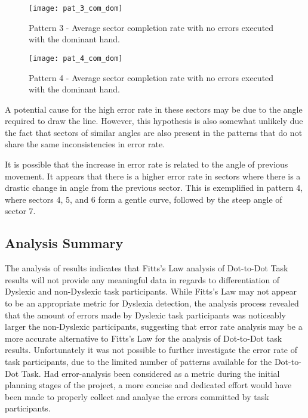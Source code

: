 		\begin{figure}[!h]
			\centering
			\texttt{[image: pat\_3\_com\_dom]}
			\caption{Pattern 3 - Average sector completion rate with no errors executed with the dominant hand.}
			\label{fig_pat_3_com_dom}
		\end{figure}		
		
		\begin{figure}[!h]
			\centering
			\texttt{[image: pat\_4\_com\_dom]}
			\caption{Pattern 4 - Average sector completion rate with no errors executed with the dominant hand.}
			\label{fig_pat_4_com_dom}
		\end{figure}	
		
		A potential cause for the high error rate in these sectors may be due to the angle required to draw the line. However, this hypothesis is also somewhat unlikely due the fact that sectors of similar angles are also present in the patterns that do not share the same inconsistencies in error rate. 
		
		It is possible that the increase in error rate is related to the angle of previous movement. It appears that there is a higher error rate in sectors where there is a drastic change in angle from the previous sector. This is exemplified in pattern 4, where sectors 4, 5, and 6 form a gentle curve, followed by the steep angle of sector 7.
		
	\subsection{Analysis Summary}
		The analysis of results indicates that Fitts’s Law analysis of Dot-to-Dot Task results will not provide any meaningful data in regards to differentiation of Dyslexic and non-Dyslexic task participants. While Fitts’s Law may not appear to be an appropriate metric for Dyslexia detection, the analysis process revealed that the amount of errors made by Dyslexic task participants was noticeably larger the non-Dyslexic participants, suggesting that error rate analysis may be a more accurate alternative to Fitts’s Law for the analysis of Dot-to-Dot task results. Unfortunately it was not possible to further investigate the error rate of task participants, due to the limited number of patterns available for the Dot-to-Dot Task. Had error-analysis been considered as a metric during the initial planning stages of the project, a more concise and dedicated effort would have been made to properly collect and analyse the errors committed by task participants.	
\newpage
